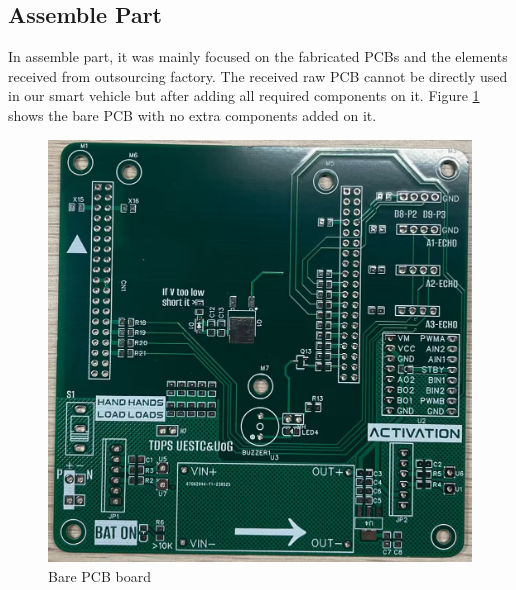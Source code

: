 \documentclass[12pt, a4paper, oneside]{report}
\begin{document}
\subsection{Assemble Part}
In assemble part, it was mainly focused on the fabricated PCBs and the elements received from outsourcing factory. The received raw PCB cannot be directly used in our smart vehicle but after adding all required components on it. Figure \ref{fig:pcb13} shows the bare PCB with no extra components added on it.
\begin{figure}[!h]
	\centering
	\includegraphics[scale=0.17]{pic/PCB_figure/13_PCB.jpg}
	\caption{Bare PCB board}
    \label{fig:pcb13}
\end{figure}
\end{document}
